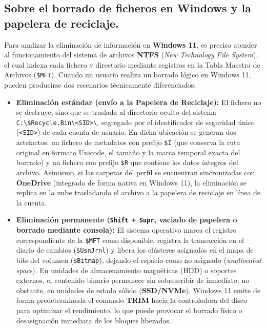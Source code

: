 \newpage
\subsection{Sobre el borrado de ficheros en Windows y la papelera de reciclaje.}
Para analizar la eliminación de información en \textbf{Windows 11}, es preciso atender al funcionamiento del sistema de archivos \textbf{NTFS} (\textit{New Technology File System}), el cual indexa cada fichero y directorio mediante registros en la Tabla Maestra de Archivos (\texttt{\$MFT}). Cuando un usuario realiza un borrado lógico en Windows 11, pueden producirse dos escenarios técnicamente diferenciados:

\begin{itemize}[leftmargin=1.5em]
	\item \textbf{Eliminación estándar (envío a la Papelera de Reciclaje):} El fichero no se destruye, sino que se traslada al directorio oculto del sistema \texttt{C:\textbackslash \$Recycle.Bin\textbackslash <SID>\textbackslash}, segregado por el identificador de seguridad único (\texttt{<SID>}) de cada cuenta de usuario. En dicha ubicación se generan dos artefactos: un fichero de metadatos con prefijo \texttt{\$I} (que conserva la ruta original en formato Unicode, el tamaño y la marca temporal exacta del borrado) y un fichero con prefijo \texttt{\$R} que contiene los datos íntegros del archivo. Asimismo, si las carpetas del perfil se encuentran sincronizadas con \textbf{OneDrive} (integrado de forma nativa en Windows 11), la eliminación se replica en la nube trasladando el archivo a la papelera de reciclaje en línea de la cuenta.
	\item \textbf{Eliminación permanente (\texttt{Shift + Supr}, vaciado de papelera o borrado mediante consola):} El sistema operativo marca el registro correspondiente de la \texttt{\$MFT} como disponible, registra la transacción en el diario de cambios (\texttt{\$UsnJrnl}) y libera los clústeres asignados en el mapa de bits del volumen (\texttt{\$Bitmap}), dejando el espacio como no asignado (\textit{unallocated space}). En unidades de almacenamiento magnéticas (HDD) o soportes externos, el contenido binario permanece sin sobrescribir de inmediato; no obstante, en unidades de estado sólido (\textbf{SSD/NVMe}), Windows 11 emite de forma predeterminada el comando \textbf{TRIM} hacia la controladora del disco para optimizar el rendimiento, lo que puede provocar el borrado físico o desasignación inmediata de los bloques liberados.
\end{itemize}


